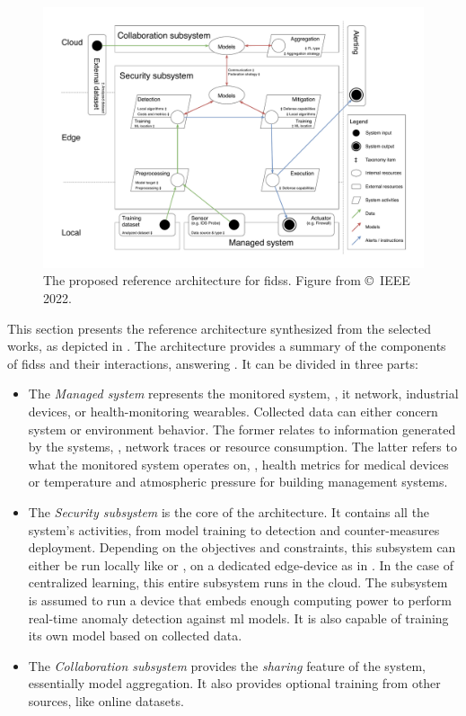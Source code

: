 \begin{figure}
  \centering
  \includegraphics[width=.95\textwidth]{figures/architecture.drawio.pdf}
  \caption[
    The proposed reference architecture for \glspl{fids}.
  ]{
    The proposed reference architecture for \glspl{fids}.
    Figure from \textcite{lavaur_tnsm_2022} \copyright~IEEE 2022.
    \label{fig:sota.archi}
  }
\end{figure}

This section presents the reference architecture synthesized from the selected works, as depicted in .
The architecture provides a summary of the components of \glspl{fids} and their interactions, answering .
It can be divided in three parts:
\begin{itemize}
  \item The \emph{Managed system} represents the monitored system, \eg, \gls{it} network, industrial devices, or health-monitoring wearables.
  Collected data can either concern system or environment behavior.
  The former relates to information generated by the systems, \eg, network traces or resource consumption.
  The latter refers to what the monitored system operates on, \eg, health metrics for medical devices or temperature and atmospheric pressure for building management systems.
  
  \item The \emph{Security subsystem} is the core of the architecture.
  It contains all the system's activities, from model training to detection and counter-measures deployment.
  Depending on the objectives and constraints, this subsystem can either be run locally like \cite{pahl_AllEyesYou_2018} or \cite{hei_trustedfeatureaggregator_2020}, on a dedicated edge-device as in \cite{li_DeepFedFederatedDeep_2020}.
  In the case of centralized learning, this entire subsystem runs in the cloud.
  The subsystem is assumed to run a device that embeds enough computing power to perform real-time anomaly detection against \gls{ml} models.
  It is also capable of training its own model based on collected data.

  \item The \emph{Collaboration subsystem} provides the \emph{sharing} feature of the system, essentially model aggregation.
  It also provides optional training from other sources, like online datasets.
\end{itemize}

